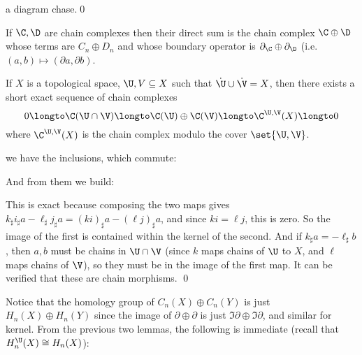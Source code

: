 \elemm

\Proof a diagram chase.\qed

\bdefn

    If $\C,\D$ are chain complexes then their {\emphcolor direct sum} is the chain complex $\C\oplus\D$ whose terms are $C_n\oplus D_n$ and whose boundary operator is $\partial_\C\oplus\partial_\D$ (i.e.
    $(a,b)\mapsto(\partial a,\partial b)$.

\edefn

\blemm

    If $X$ is a topological space, $\U,V\subseteq X$ such that $\Dot\U\cup\Dot\V=X$, then there exists a short exact sequence of chain complexes
    $$ 0 \longto \C(\U\cap\V) \longto \C(\U) \oplus \C(\V) \longto \C^{\U,\V}(X) \longto 0 $$
    where $\C^{\U,\V}(X)$ is the chain complex modulo the cover $\set{\U,\V}$.

\elemm

\Proof we have the inclusions, which commute:

\centerline{}

And from them we build:

\centerline{}

This is exact because composing the two maps gives $k_\sharp i_\sharp a-\ell_\sharp j_\sharp a=(ki)_\sharp a-(\ell j)_\sharp a$, and since $ki=\ell j$, this is zero.
So the image of the first is contained within the kernel of the second.
And if $k_\sharp a=-\ell_\sharp b$, then $a,b$ must be chains in $\U\cap\V$ (since $k$ maps chains of $\U$ to $X$, and $\ell$ maps chains of $\V$), so they must be in the image of the first map.
It can be verified that these are chain morphisms.
\qed

Notice that the homology group of $C_n(X)\oplus C_n(Y)$ is just $H_n(X)\oplus H_n(Y)$ since the image of $\partial\oplus\partial$ is just $\Im\partial\oplus\Im\partial$, and similar for kernel.
From the previous two lemmas, the following is immediate (recall that $H^\U_n(X)\cong H_n(X)$):

